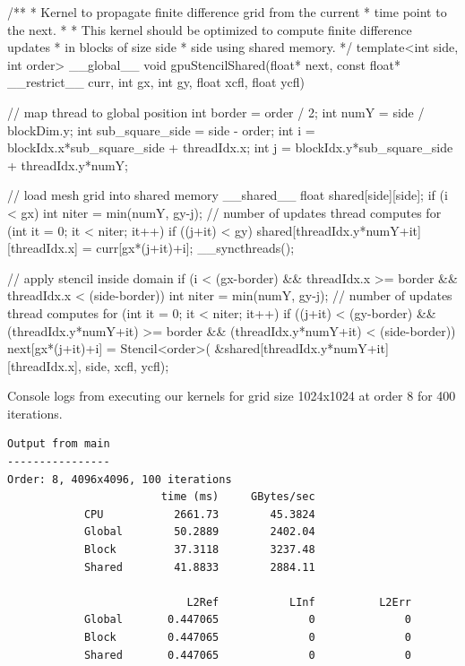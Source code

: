 \documentclass[12pt,letterpaper,twoside]{article}
\begin{document}
\begin{cpp}
/**
* Kernel to propagate finite difference grid from the current
* time point to the next.
*
* This kernel should be optimized to compute finite difference updates
* in blocks of size side * side using shared memory.
*/
template<int side, int order>
__global__
void gpuStencilShared(float* next, const float* __restrict__ curr, int gx, int gy,
               float xcfl, float ycfl) {
    
    // map thread to global position
    int border = order / 2;
    int numY = side / blockDim.y;
    int sub_square_side = side - order;
    int i = blockIdx.x*sub_square_side + threadIdx.x;
    int j = blockIdx.y*sub_square_side + threadIdx.y*numY;
    
    // load mesh grid into shared memory
    __shared__ float shared[side][side];
    if (i < gx) 
    {
        int niter = min(numY, gy-j);  // number of updates thread computes 
	for (int it = 0; it < niter; it++) {
	    if ((j+it) < gy) {
	        shared[threadIdx.y*numY+it][threadIdx.x] = curr[gx*(j+it)+i];
	    }
	}
    }
    __syncthreads(); 

    // apply stencil inside domain
    if (i < (gx-border) &&
	threadIdx.x >= border && 
	threadIdx.x < (side-border)) 
    {
        int niter = min(numY, gy-j);  // number of updates thread computes 
        for (int it = 0; it < niter; it++) {
            if ((j+it) < (gy-border) &&
                (threadIdx.y*numY+it) >= border &&
                    (threadIdx.y*numY+it) < (side-border)) 
            {
                next[gx*(j+it)+i] = Stencil<order>(
                    &shared[threadIdx.y*numY+it][threadIdx.x], 
                    side, 
                    xcfl, 
                    ycfl);
            }
        }
    }
} 
\end{cpp}

\pagebreak
Console logs from executing our kernels for grid size 1024x1024
at order 8 for 400 iterations.

\begin{verbatim}
Output from main
----------------
Order: 8, 4096x4096, 100 iterations
                        time (ms)     GBytes/sec
            CPU           2661.73        45.3824
            Global        50.2889        2402.04
            Block         37.3118        3237.48
            Shared        41.8833        2884.11

                            L2Ref           LInf          L2Err
            Global       0.447065              0              0
            Block        0.447065              0              0
            Shared       0.447065              0              0
\end{verbatim}
\end{document}
